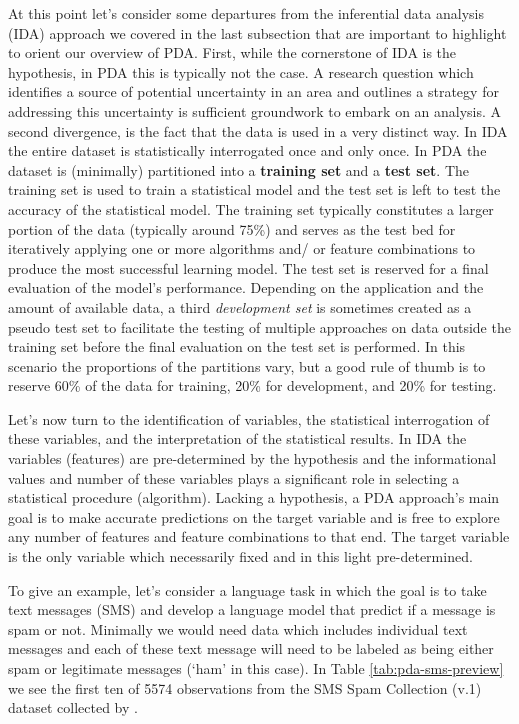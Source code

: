 \documentclass[
]{article}
\begin{document}
At this point let's consider some departures from the inferential data analysis (IDA) approach we covered in the last subsection that are important to highlight to orient our overview of PDA. First, while the cornerstone of IDA is the hypothesis, in PDA this is typically not the case. A research question which identifies a source of potential uncertainty in an area and outlines a strategy for addressing this uncertainty is sufficient groundwork to embark on an analysis. A second divergence, is the fact that the data is used in a very distinct way. In IDA the entire dataset is statistically interrogated once and only once. In PDA the dataset is (minimally) partitioned into a \textbf{training set} and a \textbf{test set}. The training set is used to train a statistical model and the test set is left to test the accuracy of the statistical model. The training set typically constitutes a larger portion of the data (typically around 75\%) and serves as the test bed for iteratively applying one or more algorithms and/ or feature combinations to produce the most successful learning model. The test set is reserved for a final evaluation of the model's performance. Depending on the application and the amount of available data, a third \emph{development set} is sometimes created as a pseudo test set to facilitate the testing of multiple approaches on data outside the training set before the final evaluation on the test set is performed. In this scenario the proportions of the partitions vary, but a good rule of thumb is to reserve 60\% of the data for training, 20\% for development, and 20\% for testing.

Let's now turn to the identification of variables, the statistical interrogation of these variables, and the interpretation of the statistical results. In IDA the variables (features) are pre-determined by the hypothesis and the informational values and number of these variables plays a significant role in selecting a statistical procedure (algorithm). Lacking a hypothesis, a PDA approach's main goal is to make accurate predictions on the target variable and is free to explore any number of features and feature combinations to that end. The target variable is the only variable which necessarily fixed and in this light pre-determined.

To give an example, let's consider a language task in which the goal is to take text messages (SMS) and develop a language model that predict if a message is spam or not. Minimally we would need data which includes individual text messages and each of these text message will need to be labeled as being either spam or legitimate messages (`ham' in this case). In Table \ref{tab:pda-sms-preview} we see the first ten of 5574 observations from the SMS Spam Collection (v.1) dataset collected by \citet{Almeida2011a}.
\end{document}
